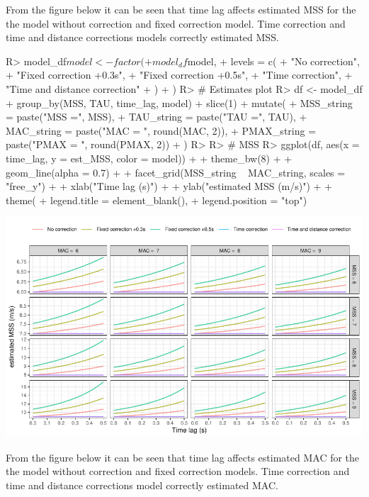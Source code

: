 \documentclass[
]{jss}
\begin{document}
From the figure below it can be seen that time lag affects estimated MSS for the the model without correction and fixed correction model. Time correction and time and distance corrections models correctly estimated MSS.

\begin{CodeChunk}
\begin{CodeInput}
R> model_df$model <- factor(
+   model_df$model,
+   levels = c(
+     "No correction",
+     "Fixed correction +0.3s",
+     "Fixed correction +0.5s",
+     "Time correction",
+     "Time and distance correction"
+   )
+ )
R> # Estimates plot
R> df <- model_df %
+   group_by(MSS, TAU, time_lag, model) %
+   slice(1) %
+   mutate(
+     MSS_string = paste("MSS =", MSS),
+     TAU_string = paste("TAU =", TAU),
+     MAC_string = paste("MAC = ", round(MAC, 2)),
+     PMAX_string = paste("PMAX = ", round(PMAX, 2))
+   )
R> 
R> # MSS
R> ggplot(df, aes(x = time_lag, y = est_MSS, color = model)) +
+   theme_bw(8) +
+   geom_line(alpha = 0.7) +
+   facet_grid(MSS_string ~ MAC_string, scales = "free_y") +
+   xlab("Time lag (s)") +
+   ylab("estimated MSS (m/s)") +
+   theme(
+     legend.title = element_blank(),
+     legend.position = "top")
\end{CodeInput}


\begin{center}\includegraphics[width=1\linewidth]{paper_files/figure-latex/unnamed-chunk-40-1} \end{center}

\end{CodeChunk}

From the figure below it can be seen that time lag affects estimated MAC for the the model without correction and fixed correction models. Time correction and time and distance corrections model correctly estimated MAC.
\end{document}
